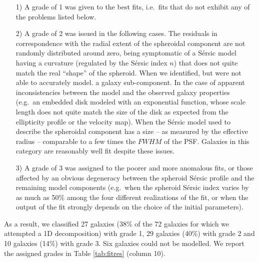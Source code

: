 \documentclass[preprint2]{emulateapj}
\begin{document}
\begin{itemize}
\item [1)] A grade of 1 was given to the best fits, i.e.~fits that do not exhibit any of the problems listed below.
\item [2)] A grade of 2 was issued in the following cases. 
The residuals in correspondence with the radial extent of the spheroidal component are not randomly distributed around zero, 
being symptomatic of a S\'ersic model having a curvature (regulated by the S\'ersic index $n$) 
that does not quite match the real ``shape'' of the spheroid. 
When we identified, but were not able to accurately model. a galaxy sub-component.
In the case of apparent inconsistencies between the model and the observed galaxy properties 
(e.g.~an embedded disk modeled with an exponential function, 
whose scale length does not quite match the size of the disk as expected from the ellipticity profile or the velocity map).
When the S\'ersic model used to describe the spheroidal component has a size -- as measured by the effective radius -- 
comparable to a few times the $FWHM$ of the PSF.
Galaxies in this category are reasonably well fit despite these issues.
\item [3)] A grade of 3 was assigned to the poorer and more anomalous fits, 
or those affected by an obvious degeneracy between the spheroid S\'ersic profile and the remaining model components 
(e.g.~when the spheroid S\'ersic index varies by as much as 50\% among the four different realizations of the fit, 
or when the output of the fit strongly depends on the choice of the initial parameters).
\end{itemize}
As a result, we classified 27 galaxies (38\% of the 72 galaxies for which we attempted a 1D decomposition) with grade 1, 
29 galaxies (40\%) with grade 2 and 10 galaxies (14\%) with grade 3.
Six galaxies could not be modelled.
We report the assigned grades in Table \ref{tab:fitres} (column 10).
\end{document}
